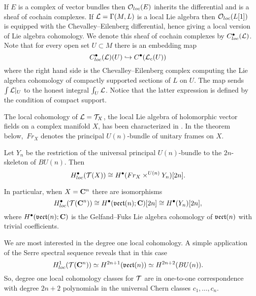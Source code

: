 \documentclass[11pt]{amsart}
\begin{document}
If $E$ is a complex of vector bundles then ${\mathcal O}_{loc}(E)$ inherits the differential and is a sheaf of cochain complexes.
If $\mathcal L = \Gamma(M, L)$ is a local Lie algebra then ${\mathcal O}_{loc}(L[1])$ is equipped with the Chevalley--Eilenberg differential, hence giving a local version of Lie algebra cohomology.
We denote this sheaf of cochain complexes by $C^\bullet_{loc}(\mathcal L)$.
Note that for every open set $U \subset M$ there is an embedding map
\begin{equation}\label{eqn:localtocompact}
C^\bullet_{loc}(\mathcal L)(U) \hookrightarrow C^\bullet(\mathcal L_c(U)) 
\end{equation}
where the right hand side is the Chevalley--Eilenberg complex computing the Lie algebra cohomology of compactly supported sections of $L$ on $U$.
The map sends $\int \mathcal L|_{U}$ to the honest integral $\int_{U} \mathcal L$.
Notice that the latter expression is defined by the condition of compact support.

The local cohomology of $\mathcal L=\mathcal T_X$, the local Lie algebra of holomorphic vector fields on a complex manifold $X$, has been characterized in \cite{BWgf}.
In the theorem below,~$Fr_X$ denotes the principal $U(n)$-bundle of unitary frames on $X$.

\begin{thm}
Let $Y_n$ be the restriction of the universal principal $U(n)$-bundle to the $2n$-skeleton of $BU(n)$.
Then
\begin{equation}
H^\bullet_{loc} (\mathcal T(X)) \cong H^\bullet(Fr_X \times^{U(n)} Y_n)[2n] .
\end{equation}

In particular, when $X = \mathbf{C}^n$ there are isomorphisms
\begin{equation}
H^\bullet_{loc} (\mathcal T(\mathbf{C}^n)) \cong H^\bullet(\mathfrak{vect}(n) ; \mathbf{C})[2n] \cong H^\bullet(Y_n)[2n] ,
\end{equation}
where $H^\bullet(\mathfrak{vect}(n) ; \mathbf{C})$ is the Gelfand--Fuks Lie algebra cohomology of $\mathfrak{vect}(n)$ with trivial coefficients.
\end{thm}

We are most interested in the degree one local cohomology.
A simple application of the Serre spectral sequence reveals that in this case 
\begin{equation}
H^1_{loc}(\mathcal T(\mathbf{C}^n)) \simeq H^{2n+1}(\mathfrak{vect}(n)) \simeq H^{2n+2} (BU(n)) .
\end{equation}
So, degree one local cohomology classes for $\mathcal T$ are in one-to-one correspondence with degree $2n+2$ polynomials in the universal Chern classes $c_1,\ldots,c_n$.
\end{document}
